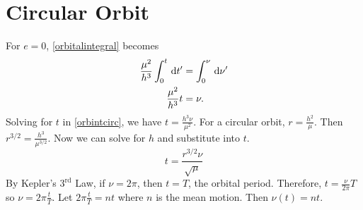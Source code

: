\hypersetup{pageanchor = false}
\section{Circular Orbit}
\label{circular}

For \(e = 0\), \cref{orbitalintegral} becomes
\begin{align}
  \frac{\mu^2}{h^3}\int_0^t\, \mathrm{d} t' & = \int_0^{\nu}\, \mathrm{d}\nu'\notag\\
  \frac{\mu^2}{h^3}t & = \nu\label{orbintcirc}.
\end{align}
Solving for \(t\) in \cref{orbintcirc}, we have \(t = \frac{h^3\nu}{\mu^2}\).
For a circular orbit, \(r = \frac{h^2}{\mu}\).
Then \(r^{3/2} = \frac{h^3}{\mu^{3/2}}\).
Now we can solve for \(h\) and substitute into \(t\).
\[
t = \frac{r^{3/2}\nu}{\sqrt{\mu}}
\]
By Kepler's \(3^{\text{rd}}\) Law, if \(\nu = 2\pi\), then \(t = T\), the
orbital period.
Therefore, \(t = \frac{\nu}{2\pi}T\) so \(\nu = 2\pi\frac{t}{T}\).
Let \(2\pi\frac{t}{T} = nt\) where \(n\) is the mean motion.
Then \(\nu(t) = nt\).
